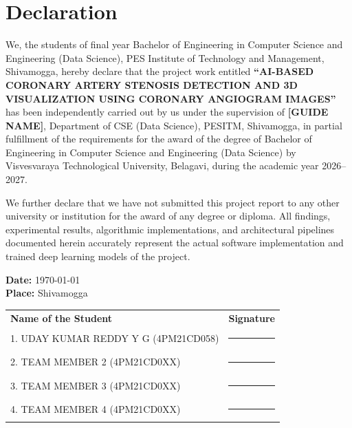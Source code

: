\chapter*{Declaration}

We, the students of final year Bachelor of Engineering in Computer Science and Engineering (Data Science), PES Institute of Technology and Management, Shivamogga, hereby declare that the project work entitled \textbf{``AI-BASED CORONARY ARTERY STENOSIS DETECTION AND 3D VISUALIZATION USING CORONARY ANGIOGRAM IMAGES''} has been independently carried out by us under the supervision of \textbf{[GUIDE NAME]}, Department of CSE (Data Science), PESITM, Shivamogga, in partial fulfillment of the requirements for the award of the degree of Bachelor of Engineering in Computer Science and Engineering (Data Science) by Visvesvaraya Technological University, Belagavi, during the academic year 2026--2027.

We further declare that we have not submitted this project report to any other university or institution for the award of any degree or diploma. All findings, experimental results, algorithmic implementations, and architectural pipelines documented herein accurately represent the actual software implementation and trained deep learning models of the project.

\vspace{2.5cm}

\noindent
\textbf{Date:} \today \\
\textbf{Place:} Shivamogga

\vspace{1.5cm}
\noindent
\begin{tabular*}{\textwidth}{@{\extracolsep{\fill}}ll}
\textbf{Name of the Student} & \textbf{Signature} \\[0.8cm]
1. UDAY KUMAR REDDY Y G (4PM21CD058) & \rule{5.0cm}{0.4pt} \\[0.8cm]
2. TEAM MEMBER 2 (4PM21CD0XX) & \rule{5.0cm}{0.4pt} \\[0.8cm]
3. TEAM MEMBER 3 (4PM21CD0XX) & \rule{5.0cm}{0.4pt} \\[0.8cm]
4. TEAM MEMBER 4 (4PM21CD0XX) & \rule{5.0cm}{0.4pt} \\
\end{tabular*}
